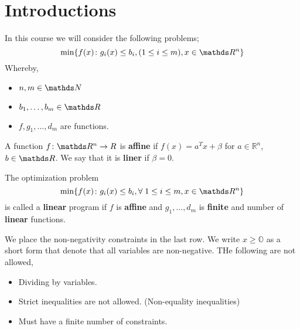 \documentclass[12pt,oneside]{book} %
\begin{document}
		\section{Introductions}
        In this course we will consider the following problems;
        $$\text{min}\{f(x) \colon g_i(x) \leq b_i, (1 \leq i \leq m), x\in \R^n\}$$
        Whereby,
        \begin{itemize}
            \item $n,m \in \N$
            \item $b_1,\dots,b_m\in\R$
            \item $f,g_1,\dots,d_m$ are functions.
        \end{itemize}
        \begin{defn*}
            A function $f \colon \R^n \rightarrow R$ is \textbf{affine} if $f(x) = a^Tx + \beta$ for $a\in \mathbb R^n$, $b\in \R$. We say that it is \textbf{liner} if $\beta = 0$.
        \end{defn*}
        \begin{defn*}
            The optimization problem
        $$\text{min}\{f(x) \colon g_i(x) \leq b_i, \forall 1 \leq i \leq m, x\in \R^n\}$$
        is called a \textbf{linear} program if $f$ is \textbf{affine} and $g_1,\dots,d_m$ is \textbf{finite} and number of \textbf{linear} functions. 
        \begin{rem}
            We place the non-negativity constraints in the last row. We write $x \geq \mathbb O$ as a short form that denote that all variables are non-negative. THe following are not allowed,
            \begin{itemize}      
                \item Dividing by variables.
                \item Strict inequalities are not allowed. (Non-equality inequalities)
                \item Must have a finite number of constraints.

            \end{itemize}
         \end{rem}

        \end{defn*}
		




\end{document}
